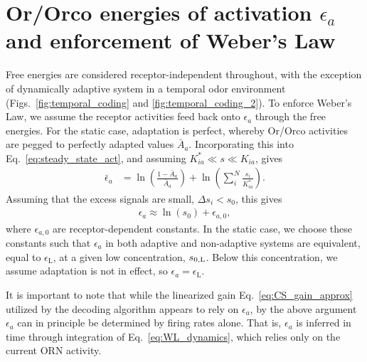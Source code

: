 \documentclass[letterpaper,12pt]{article}
\begin{document}
	\section*{Or/Orco  energies of activation $\epsilon_a$ and enforcement of Weber's Law}
	Free energies are considered receptor-independent throughout, with the exception of dynamically adaptive system in a temporal odor environment (Figs.~\ref{fig:temporal_coding} and \ref{fig:temporal_coding_2}). To enforce Weber's Law, we assume the receptor activities feed back onto $\epsilon_a$ through the free energies. For the static case, adaptation is perfect, whereby Or/Orco activities are pegged to perfectly adapted values $\bar {A}_{a}$. Incorporating this into Eq.~\ref{eq:steady_state_act}, and assuming  $K^*_{ia} \ll s \ll K_{ia}$, gives
	\begin{align}
	\bar \epsilon_a &= \ln\left(\frac{1-\bar {A}_{a}}{\bar {A}_{a}}\right) + \ln\left(\sum_i^N\frac{s_i}{K_{ia}^*}\right).
	\label{eq:adapted_epsilon}
	\end{align}
	Assuming that the excess signals are small, $\Delta s_i < s_0$, this gives 
	\begin{align}
	\epsilon_a \approx \ln(s_0) + \epsilon_{a, 0},
	\label{eq:WL_approx}
	\end{align} 
	where $\epsilon_{a, 0}$ are receptor-dependent constants. In the static case, we choose these constants such that $\epsilon_{a}$ in both adaptive and non-adaptive systems are equivalent, equal to $\epsilon_{\text {L}}$, at a given low concentration, $s_{0, \text L}$.  Below this concentration, we assume adaptation is not in effect, so $\epsilon_a  = \epsilon_{\text {L}}$.  
	
	It is important to note that while the linearized gain Eq.~\ref{eq:CS_gain_approx} utilized by the decoding algorithm appears to rely on $\epsilon_a$, by the above argument $\epsilon_a$ can in principle be determined by firing rates alone. That is, $\epsilon_a$ is inferred in time through integration of Eq.~\ref{eq:WL_dynamics}, which relies only on the current ORN activity.
	
\end{document}
